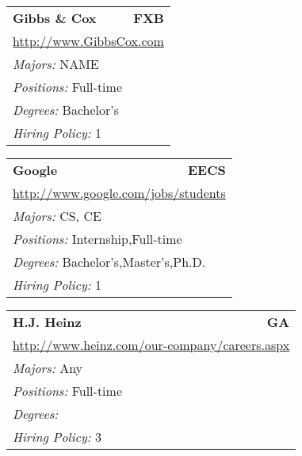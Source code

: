 \documentclass[twoside]{article}
\begin{document}
\begin{center}
\begin{multicols}{3}
\begin{FlushLeft}
\begin{minipage}{.9\columnwidth}
\end{minipage}
 
\begin{minipage}{.9\columnwidth}\begin{tabularx}{.95\columnwidth}{Xr}
                 {\Large\bf Gibbs \& Cox} & {\Large\bf FXB}\\
    \multicolumn{2}{p{.95\columnwidth}}{\url{http://www.GibbsCox.com}}\\
    \multicolumn{2}{p{.95\columnwidth}}{\emph{Majors:} NAME}\\
    \multicolumn{2}{p{.95\columnwidth}}{\emph{Positions:} Full-time}\\
    \multicolumn{2}{p{.95\columnwidth}}{\emph{Degrees:} Bachelor's}\\
    \multicolumn{2}{p{.95\columnwidth}}{\emph{Hiring Policy:} 1}\\
    \end{tabularx}
    
\end{minipage}
 
\begin{minipage}{.9\columnwidth}\begin{tabularx}{.95\columnwidth}{Xr}
                 {\Large\bf Google} & {\Large\bf EECS}\\
    \multicolumn{2}{p{.95\columnwidth}}{\url{http://www.google.com/jobs/students}}\\
    \multicolumn{2}{p{.95\columnwidth}}{\emph{Majors:} CS, CE}\\
    \multicolumn{2}{p{.95\columnwidth}}{\emph{Positions:} Internship,Full-time}\\
    \multicolumn{2}{p{.95\columnwidth}}{\emph{Degrees:} Bachelor's,Master's,Ph.D.}\\
    \multicolumn{2}{p{.95\columnwidth}}{\emph{Hiring Policy:} 1}\\
    \end{tabularx}
    
\end{minipage}
 
\begin{minipage}{.9\columnwidth}\begin{tabularx}{.95\columnwidth}{Xr}
                 {\Large\bf H.J. Heinz} & {\Large\bf GA}\\
    \multicolumn{2}{p{.95\columnwidth}}{\url{http://www.heinz.com/our-company/careers.aspx}}\\
    \multicolumn{2}{p{.95\columnwidth}}{\emph{Majors:} Any}\\
    \multicolumn{2}{p{.95\columnwidth}}{\emph{Positions:} Full-time}\\
    \multicolumn{2}{p{.95\columnwidth}}{\emph{Degrees:} }\\
    \multicolumn{2}{p{.95\columnwidth}}{\emph{Hiring Policy:} 3}\\
    \end{tabularx}
    

\end{minipage}
\end{FlushLeft}
\end{multicols}
\end{center}
\end{document}
